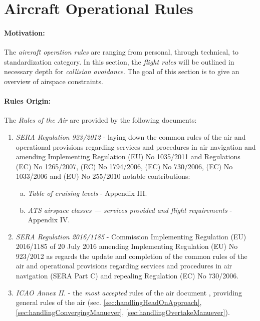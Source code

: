 \section{Aircraft Operational Rules}\label{sec:AircraftOperationRules}
\paragraph{Motivation:} The \emph{aircraft operation rules} are ranging from personal, through technical, to standardization category. In this section, the \emph{flight rules} will be outlined in necessary depth for \emph{collision avoidance}. The goal of this section is to give an overview of airspace constraints. 

\paragraph{Rules Origin:} The \emph{Rules of the Air} are provided by the following documents:

\begin{enumerate}
    \item \emph{SERA Regulation 923/2012} - laying down the common rules of the air and operational provisions regarding services and procedures in air navigation and amending Implementing Regulation (EU) No 1035/2011 and Regulations (EC) No 1265/2007, (EC) No 1794/2006, (EC) No 730/2006, (EC) No 1033/2006 and (EU) No 255/2010 \cite{rulesOfTheFlight2012} notable contributions:
    \begin{enumerate}[a.]
        \item \emph{Table of cruising levels} - Appendix III.
        \item \emph{ATS airspace classes — services provided and flight requirements} - Appendix IV.
    \end{enumerate}
    
    \item \emph{SERA Regulation 2016/1185} - Commission Implementing Regulation (EU) 2016/1185 of 20 July 2016 amending Implementing Regulation (EU) No 923/2012 as regards the update and completion of the common rules of the air and operational provisions regarding services and procedures in air navigation (SERA Part C) and repealing Regulation (EC) No 730/2006.

    \item \emph{ICAO  Annex II.} - the \emph{most accepted} rules of the air document \cite{icaoAnnex2}, providing general rules of the air (sec. \ref{sec:handlingHeadOnApproach}, \ref{sec:handlingConvergingManuever}, \ref{sec:handlingOvertakeManuever}).
\end{enumerate}

